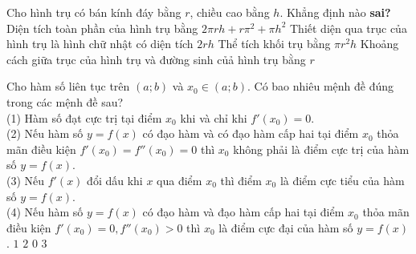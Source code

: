 \begin{ex}%
	Cho hình trụ có bán kính đáy bằng $r$, chiều cao bằng $ h $. Khẳng định nào \textbf{sai?}
	\choice
	{\True Diện tích toàn phần của hình trụ bằng $2\pi rh+r\pi^2+\pi h^2$}
	{Thiết diện qua trục của hình trụ là hình chữ nhật có diện tích $2rh$}
	{Thể tích khối trụ bằng $\pi r^2h$}
	{Khoảng cách giữa trục của hình trụ và đường sinh củả hình trụ bằng $r$}
\end{ex}
\begin{ex}%
	Cho hàm số liên tục trên $(a;b)$ và $x_0\in (a;b).$ Có bao nhiêu mệnh đề đúng trong các mệnh đề sau?\\
	(1) Hàm số đạt cực trị tại điểm $x_0$ khi và chỉ khi ${f}'(x_0)=0.$ \\
	(2) Nếu hàm số $y=f(x)$ có đạo hàm và có đạo hàm cấp hai tại điểm $x_0$ thỏa mãn điều kiện $f'(x_0)=f''(x_0)=0$ thì $x_0$ không phải là điểm cực trị của hàm số $y=f(x)$.\\
	(3) Nếu ${f}'(x)$ đổi dấu khi $ x $ qua điểm $x_0$ thì điểm $x_0$ là điểm cực tiểu của hàm số $y=f(x)$.\\
	(4) Nếu hàm số $y=f(x)$ có đạo hàm và đạo hàm cấp hai tại điểm $x_0$ thỏa mãn điều kiện ${f}'(x_0)=0, {f}''(x_0)>0$ thì $x_0$ là điểm cực đại của hàm số $y=f(x)$.
	\choice
	{$1$}
	{$2$}
	{\True $0$}
	{$3$}
\end{ex}

